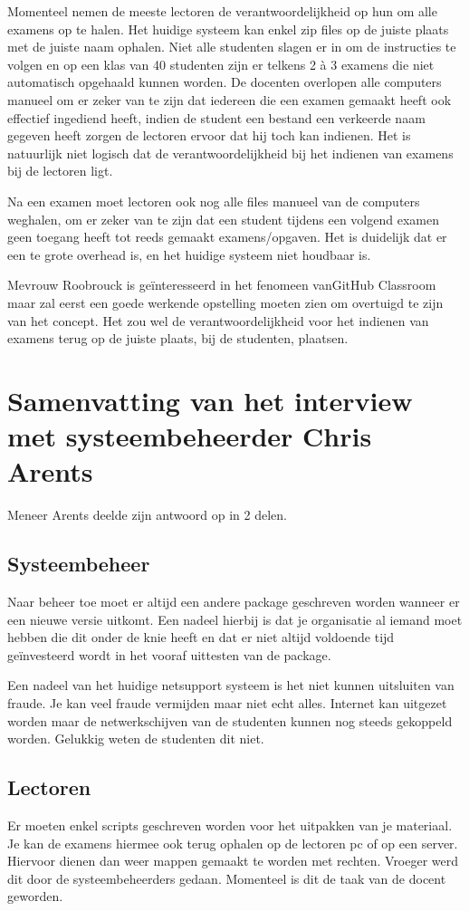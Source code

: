 Momenteel nemen de meeste lectoren de verantwoordelijkheid op hun om alle examens op te halen. Het huidige systeem kan enkel zip files op de juiste plaats met de juiste naam ophalen. Niet alle studenten slagen er in om de instructies te volgen en op een klas van 40 studenten zijn er telkens 2 à 3 examens die niet automatisch opgehaald kunnen worden. De docenten overlopen alle computers manueel om er zeker van te zijn dat iedereen die een examen gemaakt heeft ook effectief ingediend heeft, indien de student een bestand een verkeerde naam gegeven heeft zorgen de lectoren ervoor dat hij toch kan indienen. Het is natuurlijk niet logisch dat de verantwoordelijkheid bij het indienen van examens bij de lectoren ligt.

Na een examen moet lectoren ook nog alle files manueel van de computers weghalen, om er zeker van te zijn dat een student tijdens een volgend examen geen toegang heeft tot reeds gemaakt examens/opgaven. Het is duidelijk dat er een te grote overhead is, en het huidige systeem niet houdbaar is.

Mevrouw Roobrouck is geïnteresseerd in het fenomeen vanGitHub Classroom maar zal eerst een goede werkende opstelling moeten zien om overtuigd te zijn van het concept. Het zou wel de verantwoordelijkheid voor het indienen van examens terug op de juiste plaats, bij de studenten, plaatsen. \newpage

\section{Samenvatting van het interview met systeembeheerder Chris Arents}

Meneer Arents deelde zijn antwoord op in 2 delen. 
\subsection{Systeembeheer}

Naar beheer toe moet er altijd een andere package  geschreven worden wanneer er een nieuwe versie uitkomt. Een nadeel hierbij is dat je organisatie al iemand moet hebben die dit onder de knie heeft en dat er niet altijd voldoende tijd geïnvesteerd wordt in het vooraf uittesten van de package.

Een nadeel van het huidige netsupport systeem is het niet kunnen uitsluiten van fraude. Je kan veel fraude vermijden maar niet echt alles. Internet kan uitgezet worden maar de netwerkschijven van de studenten kunnen nog steeds gekoppeld worden. Gelukkig weten de studenten dit niet.

\subsection{Lectoren}

Er moeten enkel scripts geschreven worden voor het uitpakken van je materiaal. Je kan de examens hiermee ook terug ophalen op de lectoren pc of op een server. Hiervoor dienen dan weer mappen gemaakt te worden met rechten. Vroeger werd dit door de systeembeheerders gedaan. Momenteel is dit de taak van de docent geworden.